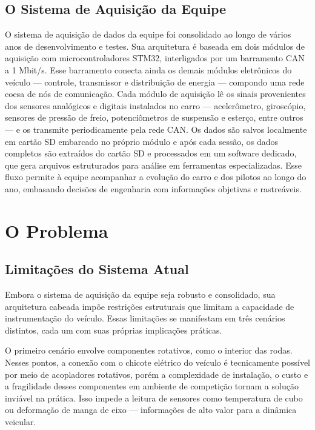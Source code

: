 \documentclass{article}
\begin{document}
    \subsection{O Sistema de Aquisição da Equipe}
    O sistema de aquisição de dados da equipe foi consolidado ao longo de vários
    anos de desenvolvimento e testes. Sua arquitetura é baseada em dois módulos de
    aquisição com microcontroladores STM32, interligados por um barramento CAN a
    1 Mbit/s. Esse barramento conecta ainda os demais módulos eletrônicos do veículo
    — controle, transmissor e distribuição de energia — compondo uma rede coesa
    de nós de comunicação. Cada módulo de aquisição lê os sinais provenientes dos
    sensores analógicos e digitais instalados no carro — acelerômetro,
    giroscópio, sensores de pressão de freio, potenciômetros de suspensão e
    esterço, entre outros — e os transmite periodicamente pela rede CAN. Os
    dados são salvos localmente em cartão SD embarcado no próprio módulo e após
    cada sessão, os dados completos são extraídos do cartão SD e processados em um
    software dedicado, que gera arquivos estruturados para análise em
    ferramentas especializadas. Esse fluxo permite à equipe acompanhar a evolução
    do carro e dos pilotos ao longo do ano, embasando decisões de engenharia com
    informações objetivas e rastreáveis.

    \section{O Problema}

    \subsection{Limitações do Sistema Atual}

    Embora o sistema de aquisição da equipe seja robusto e consolidado, sua arquitetura
    cabeada impõe restrições estruturais que limitam a capacidade de instrumentação
    do veículo. Essas limitações se manifestam em três cenários distintos, cada um
    com suas próprias implicações práticas.

    O primeiro cenário envolve componentes rotativos, como o interior das rodas.
    Nesses pontos, a conexão com o chicote elétrico do veículo é tecnicamente
    possível por meio de acopladores rotativos, porém a complexidade de instalação,
    o custo e a fragilidade desses componentes em ambiente de competição tornam
    a solução inviável na prática. Isso impede a leitura de sensores como temperatura
    de cubo ou deformação de manga de eixo — informações de alto valor para a dinâmica
    veicular.
\end{document}
